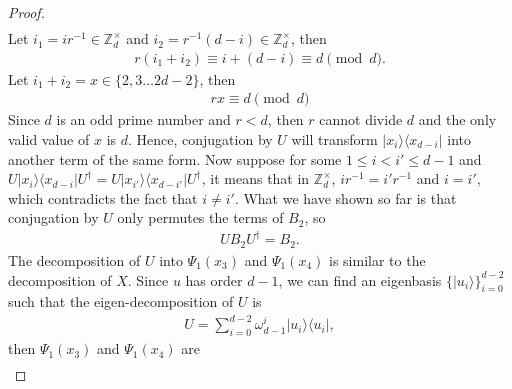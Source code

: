 \documentclass[11pt,letterpaper]{article}
\newcommand{\ket}[1]{|#1\rangle}
\newcommand{\ketbra}[2]{|#1\rangle\langle#2|}
\newcommand{\ct}{^{\dagger}}
\newcommand{\Z}{\mathbb{Z}}
\newcommand{\Zd}{\Z_d^{\times}}
\newcommand{\1}{\mathbb{1}}
\theoremstyle{definition}
\begin{document}
\begin{proof}
\begin{align}
\end{align}
Let $i_1 = i r^{-1} \in \Zd$ and $i_2  = r^{-1} (d-i) \in \Zd$, then
\begin{align*}
	r(i_1 + i_2) \equiv  i + (d-i) \equiv d \pmod{d} .
\end{align*}
Let $i_1 + i_2= x \in \{2, 3 \dots 2d-2\}$, then
\begin{align}
	rx \equiv d \pmod{d}
\end{align}
Since $d$ is an odd prime number and $r < d$, then $r$ cannot divide $d$ and the only valid value of $x$ is $d$.
Hence, conjugation by $U$ will transform $\ketbra{x_i}{x_{d-i}}$ into another term of the same form.
Now suppose for some $1 \leq i < i' \leq d-1$ and $U\ketbra{x_i}{x_{d-i}}U\ct = U\ketbra{x_{i'}}{x_{d-i'}}U\ct$,
it means that in $\Zd$, $i r^{-1} = i' r^{-1}$ and $i = i'$, which contradicts the fact that $i \neq i'$.
What we have shown so far is that conjugation by $U$ only permutes the terms of $B_2$, so
\begin{align}
	UB_2U\ct = B_2.
\end{align}
The decomposition of $U$ into $\Psi_1(x_3)$ and $\Psi_1(x_4)$ is similar to the decomposition of $X$.
Since $u$ has order $d-1$, we can find an eigenbasis $\{ \ket{u_i} \}_{i=0}^{d-2}$ such that the eigen-decomposition of $U$ is
\begin{align}
	U = \sum_{i=0}^{d-2} \omega_{d-1}^i \ketbra{u_i}{u_i},
\end{align} 
then $\Psi_1(x_3)$ and $\Psi_1(x_4)$ are  
\begin{align*}

\end{align*}
\end{proof}
\end{document}
